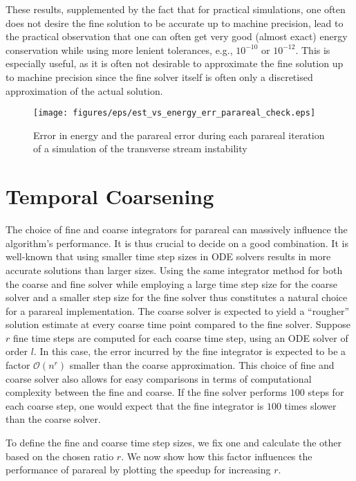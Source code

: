 These results, supplemented by the fact that for practical simulations, one often does not desire the fine solution to be accurate up to machine precision, lead to the practical observation that one can often get very good (almost exact) energy conservation while using more lenient tolerances, e.g., $10^{-10}$ or $10^{-12}$. This is especially useful, as it is often not desirable to approximate the fine solution up to machine precision since the fine solver itself is often only a discretised approximation of the actual solution.
 \begin{figure}[h]
    \centering
    \texttt{[image: figures/eps/est\_vs\_energy\_err\_parareal\_check.eps]}
    \caption{Error in energy and the parareal error during each parareal iteration of a simulation of the transverse stream instability}
    \label{fig: energy-vs-statechange}
\end{figure}


\section{Temporal Coarsening}

The choice of fine and coarse integrators for parareal can massively influence the algorithm's performance. It is thus crucial to decide on a good combination. It is well-known that using smaller time step sizes in ODE solvers results in more accurate solutions than larger sizes. Using the same integrator method for both the coarse and fine solver while employing a large time step size for the coarse solver and a smaller step size for the fine solver thus constitutes a natural choice for a parareal implementation. The coarse solver is expected to yield a ``rougher'' solution estimate at every coarse time point compared to the fine solver. Suppose $r$ fine time steps are computed for each coarse time step, using an ODE solver of order $l$. In this case, the error incurred by the fine integrator is expected to be a factor $\mathcal{O}(n^r)$ smaller than the coarse approximation. 
This choice of fine and coarse solver also allows for easy comparisons in terms of computational complexity between the fine and coarse. If the fine solver performs $100$ steps for each coarse step, one would expect that the fine integrator is $100$ times slower than the coarse solver.

To define the fine and coarse time step sizes, we fix one and calculate the other based on the chosen ratio $r$. We now show how this factor influences the performance of parareal by plotting the speedup for increasing $r$.

